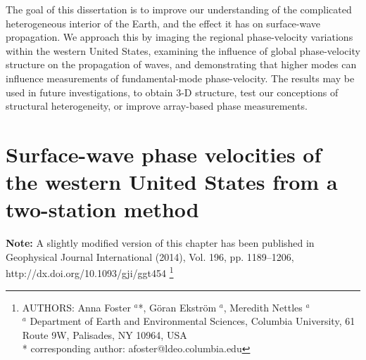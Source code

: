 \documentclass[12pt,oneside]{book}
\begin{document}
The goal of this dissertation is to improve our understanding of the complicated heterogeneous interior of the Earth, and the effect it has on surface-wave propagation. We approach this by imaging the regional phase-velocity variations within the western United States, examining the influence of global phase-velocity structure on the propagation of waves, and demonstrating that higher modes can influence measurements of fundamental-mode phase-velocity. The results may be used in future investigations, to obtain 3\nobreakdash-D structure, test our conceptions of structural heterogeneity, or improve array-based phase measurements. 

\raggedbottom
\pagebreak

\renewcommand\thechapter{\arabic{chapter}}
\singlespacing
\chapter[Surface-wave phase velocities of the western United States from a two-station method]{Surface-wave phase velocities of the western United States from a two-station method}
\label{ch:pv}
\doublespacing

\thispagestyle{fancy}

\begin{raggedright}
{\bf Note: } A slightly modified version of this chapter has been published in Geophysical Journal International (2014), Vol. 196, pp. 1189--1206, http://dx.doi.org/10.1093/gji/ggt454
\footnote{AUTHORS:  Anna Foster $^a$*,  G\"oran Ekstr\"om $^a$, Meredith Nettles $^a$\\
$^a$ Department of Earth and Environmental Sciences, Columbia University, 61 Route 9W, Palisades, NY 10964, USA\\
* corresponding author: afoster@ldeo.columbia.edu}
\end{raggedright}
\normalsize
\end{document}
